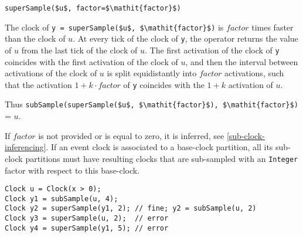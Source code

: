 \begin{operatordefinition}[superSample]
\begin{synopsis}\begin{lstlisting}
superSample($u$, factor=$\mathit{factor}$)
\end{lstlisting}\end{synopsis}
\begin{semantics}
The clock of \lstinline!y = superSample($u$, $\mathit{factor}$)! is $\mathit{factor}$ times faster than the clock of $u$.
At every tick of the clock of \lstinline!y!, the operator returns the value of $u$ from the last tick of the clock of $u$.
The first activation of the clock of \lstinline!y! coincides with the first activation of the clock of $u$, and then the interval between activations of the clock of $u$ is split equidistantly into $\mathit{factor}$ activations, such that the activation $1 + k \cdot \mathit{factor}$ of \lstinline!y! coincides with the $1 + k$ activation of $u$.
\begin{nonnormative}
Thus \lstinline!subSample(superSample($u$, $\mathit{factor}$), $\mathit{factor}$)! = $u$.
\end{nonnormative}
If $\mathit{factor}$ is not provided or is equal to zero, it is inferred, see \cref{sub-clock-inferencing}.
If an event clock is associated to a base-clock partition, all its sub-clock partitions must have resulting clocks that are sub-sampled with an \lstinline!Integer! factor with respect to this base-clock.

\begin{example}
\begin{lstlisting}[language=modelica]
Clock u = Clock(x > 0);
Clock y1 = subSample(u, 4);
Clock y2 = superSample(y1, 2); // fine; y2 = subSample(u, 2)
Clock y3 = superSample(u, 2);  // error
Clock y4 = superSample(y1, 5); // error
\end{lstlisting}
\end{example}
\end{semantics}
\end{operatordefinition}

